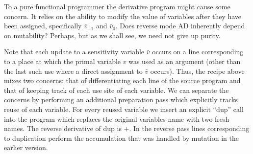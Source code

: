 \documentclass[12pt]{article}
\newcommand{\dup}{\mathrm{dup}}
\begin{document}
To a pure functional programmer the derivative program might cause some
concern.  It relies on the ability to modify the value of variables
after they have been assigned, specifically \(\bar{v}_{-1}\) and
\(\bar{v}_0\).  Does reverse mode AD inherently depend on mutability?
Perhaps, but as we shall see, we need not give up purity.

Note that each update to a sensitivity variable $\bar{v}$ occurs on a
line corresponding to a place at which the primal variable $v$ was
used as an argument (other than the last such use where a direct
assignment to $\bar{v}$ occurs). Thus, the recipe above mixes two
concerns: that of differentiating each line of the source program and
that of keeping track of each use site of each variable.  We can
separate the concerns by performing an additional preparation pass
which explicitly tracks reuse of each variable.  For every reused
variable we insert an explicit ``$\dup$'' call into the program which
replaces the original variables name with two fresh names.  The
reverse derivative of $\dup$ is $+$.  In the reverse pass lines
corresponding to duplication perform the accumulation that was handled
by mutation in the earlier version.
\end{document}
